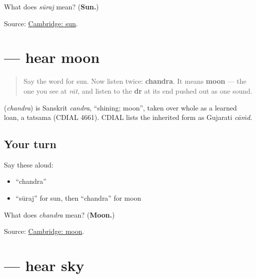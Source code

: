 \begin{tcolorbox}[breakable,colback=teal!4,colframe=teal!35!black,title={Before you move on}]
What does \emph{sūraj} mean? (\textbf{Sun.})

Source: \href{https://dictionary.cambridge.org/dictionary/english-gujarati/sun}{Cambridge: sun}.
\end{tcolorbox}
\section[\texorpdfstring{\gu{ચંદ્ર} (chandra)}{ચંદ્ર (chandra)}]{ — hear moon}

\label{lesson:GU-C29-hear-chandra}



\begin{quote}
Say the word for sun. Now listen twice: \textbf{chandra}. It means \textbf{moon} — the one you see at \emph{rāt}, and listen to the \textbf{dr} at its end pushed out as one sound.
\end{quote}

\begin{cousinweb}
\textbf{} (\emph{chandra}) is Sanskrit \emph{candra}, \textquotedblleft{}shining; moon\textquotedblright{}, taken over whole as a learned loan, a tatsama (CDIAL 4661). CDIAL lists the inherited form as Gujarati \emph{cāṁd}.
\end{cousinweb}

\subsection*{Your turn}
Say these aloud:

\begin{itemize}
\raggedright
  \item \textquotedblleft{}chandra\textquotedblright{}
  \item \textquotedblleft{}sūraj\textquotedblright{} for sun, then \textquotedblleft{}chandra\textquotedblright{} for moon
\end{itemize}

\begin{tcolorbox}[breakable,colback=teal!4,colframe=teal!35!black,title={Before you move on}]
What does \emph{chandra} mean? (\textbf{Moon.})

Source: \href{https://dictionary.cambridge.org/dictionary/english-gujarati/moon}{Cambridge: moon}.
\end{tcolorbox}
\section[\texorpdfstring{\gu{આકાશ} (ākāsh)}{આકાશ (ākāsh)}]{ — hear sky}

